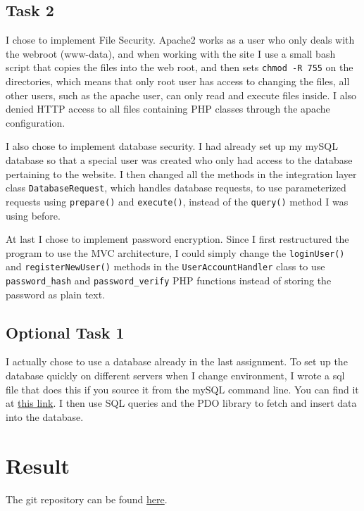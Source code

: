 \documentclass[a4paper]{scrreprt}
\newcommand{\code}[1]{\texttt{#1}}
\begin{document}
\section{Task 2}

I chose to implement File Security. Apache2 works as a user who only deals with the webroot (www-data), and when working with the site I use a small bash script that copies the files into the web root, and then sets \code{chmod -R 755} on the directories, which means that only root user has access to changing the files, all other users, such as the apache user, can only read and execute files inside. I also denied HTTP access to all files containing PHP classes through the apache configuration.

I also chose to implement database security. I had already set up my mySQL database so that a special user was created who only had access to the database pertaining to the website. I then changed all the methods in the integration layer class \code{DatabaseRequest}, which handles database requests, to use parameterized requests using \code{prepare()} and \code{execute()}, instead of the \code{query()} method I was using before.

At last I chose to implement password encryption. Since I first restructured the program to use the MVC architecture, I could simply change the \code{loginUser()} and \code{registerNewUser()} methods in the \code{UserAccountHandler} class to use \code{password\_hash} and \code{password\_verify} PHP functions instead of storing the password as plain text.

\section{Optional Task 1}

I actually chose to use a database already in the last assignment. To set up the database quickly on different servers when I change environment, I wrote a sql file that does this if you source it from the mySQL command line. You can find it at \href{https://github.com/fongie/TastyRecipes/blob/assignment3/res/sql/initDB.sql}{this link}. I then use SQL queries and the PDO library to fetch and insert data into the database.

\chapter{Result}
\label{sec:result}

The git repository can be found \href{https://github.com/fongie/TastyRecipes/tree/assignment3}{here}.
\end{document}
